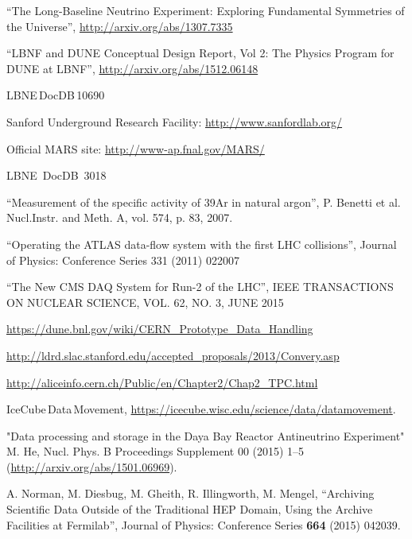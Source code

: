 \begin{thebibliography}{99}

 ``The Long-Baseline Neutrino Experiment: Exploring Fundamental Symmetries of the Universe'',  \url{http://arxiv.org/abs/1307.7335}

 ``LBNF and DUNE Conceptual Design Report, Vol 2: The Physics Program for DUNE at LBNF'', \url{http://arxiv.org/abs/1512.06148}

 LBNE\,DocDB\,10690  %

 Sanford Underground Research Facility: \url{http://www.sanfordlab.org/}

 Official MARS site: \url{http://www-ap.fnal.gov/MARS/}

 LBNE~DocDB~3018%

 ``Measurement of the specific activity of 39Ar in natural argon'', P. Benetti et al. Nucl.Instr. and Meth. A, vol. 574, p. 83, 2007.

 ``Operating the ATLAS data-flow system with the first LHC collisions'', Journal of Physics: Conference Series 331 (2011) 022007

 ``The New CMS DAQ System for Run-2 of the LHC'', IEEE TRANSACTIONS ON NUCLEAR SCIENCE, VOL. 62, NO. 3, JUNE 2015

 \url{https://dune.bnl.gov/wiki/CERN_Prototype_Data_Handling}

 \url{http://ldrd.slac.stanford.edu/accepted_proposals/2013/Convery.asp}

 \url{http://aliceinfo.cern.ch/Public/en/Chapter2/Chap2_TPC.html}

 IceCube\,Data\,Movement, \url{https://icecube.wisc.edu/science/data/datamovement}.

"Data processing and storage in the Daya Bay Reactor Antineutrino Experiment" M. He, Nucl. Phys. B Proceedings Supplement 00 (2015) 1–5 (\url{http://arxiv.org/abs/1501.06969}).

 A. Norman, M. Diesbug, M. Gheith, R. Illingworth, M. Mengel, ``Archiving Scientific Data Outside of the Traditional HEP Domain, Using the Archive Facilities at Fermilab'', Journal of Physics: Conference Series {\bf 664} (2015) 042039.


\end{thebibliography}
